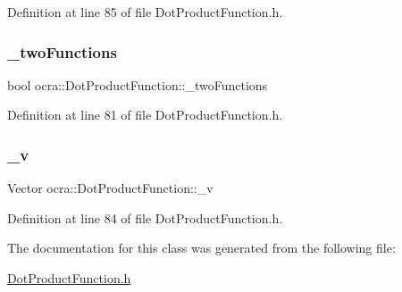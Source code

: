 Definition at line 85 of file Dot\+Product\+Function.\+h.

\hypertarget{classocra_1_1DotProductFunction_a8450996eff9607045cf57a4502ff0944}{}\label{classocra_1_1DotProductFunction_a8450996eff9607045cf57a4502ff0944} 
\subsubsection{\texorpdfstring{\+\_\+two\+Functions}{\_twoFunctions}}
{\footnotesize\ttfamily bool ocra\+::\+Dot\+Product\+Function\+::\+\_\+two\+Functions\hspace{0.3cm}{\ttfamily [protected]}}



Definition at line 81 of file Dot\+Product\+Function.\+h.

\hypertarget{classocra_1_1DotProductFunction_a6405d1f78159e5fc16801bd73eb32a68}{}\label{classocra_1_1DotProductFunction_a6405d1f78159e5fc16801bd73eb32a68} 
\subsubsection{\texorpdfstring{\+\_\+v}{\_v}}
{\footnotesize\ttfamily Vector ocra\+::\+Dot\+Product\+Function\+::\+\_\+v\hspace{0.3cm}{\ttfamily [protected]}}



Definition at line 84 of file Dot\+Product\+Function.\+h.



The documentation for this class was generated from the following file\+:\begin{DoxyCompactItemize}
\item 
\hyperlink{DotProductFunction_8h}{Dot\+Product\+Function.\+h}\end{DoxyCompactItemize}
